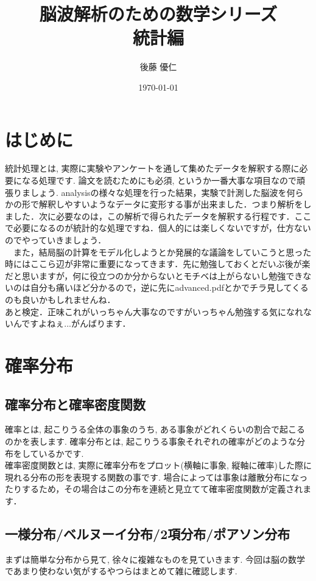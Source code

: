 \documentclass[11pt,a4paper,uplatex]{ujreport} 	%
\title{脳波解析のための数学シリーズ\\
統計編}
\author{後藤 優仁}
\date{\today}
\begin{document}
\maketitle

\newpage
%
%
\tableofcontents
\newpage
\chapter{はじめに}
 統計処理とは, 実際に実験やアンケートを通して集めたデータを解釈する際に必要になる処理です. 論文を読むためにも必須, というか一番大事な項目なので頑張りましょう. analysisの様々な処理を行った結果，実験で計測した脳波を何らかの形で解釈しやすいようなデータに変形する事が出来ました．つまり解析をしました．次に必要なのは，この解析で得られたデータを解釈する行程です．ここで必要になるのが統計的な処理ですね．個人的には楽しくないですが，仕方ないのでやっていきましょう．\\
 　また，結局脳の計算をモデル化しようとか発展的な議論をしていこうと思った時にはここら辺が非常に重要になってきます．先に勉強しておくとだいぶ後が楽だと思いますが，何に役立つのか分からないとモチベは上がらないし勉強できないのは自分も痛いほど分かるので，逆に先にadvanced.pdfとかでチラ見してくるのも良いかもしれませんね．\\

あと検定．正味これがいっちゃん大事なのですがいっちゃん勉強する気になれないんですよねぇ...がんばります．
 
 \newpage
 
 
\chapter{確率分布}
\section{確率分布と確率密度関数}
確率とは, 起こりうる全体の事象のうち, ある事象がどれくらいの割合で起こるのかを表します. 確率分布とは, 起こりうる事象それぞれの確率がどのような分布をしているかです. \\

確率密度関数とは, 実際に確率分布をプロット(横軸に事象, 縦軸に確率)した際に現れる分布の形を表現する関数の事です. 場合によっては事象は離散分布になったりするため，その場合はこの分布を連続と見立てて確率密度関数が定義されます．\\

\section{一様分布/ベルヌーイ分布/2項分布/ポアソン分布}
まずは簡単な分布から見て, 徐々に複雑なものを見ていきます. 今回は脳の数学であまり使わない気がするやつらはまとめて雑に確認します.\\
\end{document}
